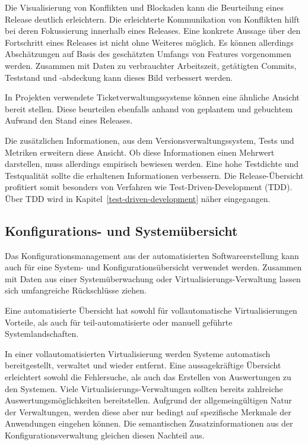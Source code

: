 Die Visualisierung von Konflikten und Blockaden kann die Beurteilung eines Release deutlich erleichtern. Die erleichterte Kommunikation von Konflikten hilft bei deren Fokussierung innerhalb eines Releases. Eine konkrete Aussage über den Fortschritt eines Releases ist nicht ohne Weiteres möglich. Es können allerdings Abschätzungen auf Basis des geschätzten Umfangs von Features vorgenommen werden. Zusammen mit Daten zu verbrauchter Arbeitszeit, getätigten Commits, Teststand und -abdeckung kann dieses Bild verbessert werden.

In Projekten verwendete Ticketverwaltungssysteme können eine ähnliche Ansicht bereit stellen. Diese beurteilen ebenfalls anhand von geplantem und gebuchtem Aufwand den Stand eines Releases.

Die zusätzlichen Informationen, aus dem Versionsverwaltungssystem, Tests und Metriken erweitern diese Ansicht. Ob diese Informationen einen Mehrwert darstellen, muss allerdings empirisch bewiesen werden.
Eine hohe Testdichte und Testqualität sollte die erhaltenen Informationen verbessern. Die Release-Übersicht profitiert somit besonders von Verfahren wie Test-Driven-Development (TDD). Über TDD wird in Kapitel~\ref{test-driven-development} näher eingegangen.

\subsection{Konfigurations- und Systemübersicht}
\label{subsubsec:configuration-system-overview}

Das Konfigurationsmanagement aus der automatisierten Softwareerstellung kann auch für eine System- und Konfigurationsübersicht verwendet werden. Zusammen mit Daten aus einer Systemüberwachung oder Virtualisierungs-Verwaltung lassen sich umfangreiche Rückschlüsse ziehen. 

Eine automatisierte Übersicht hat sowohl für vollautomatische Virtualisierungen Vorteile, als auch für teil-automatisierte oder manuell geführte Systemlandschaften.

In einer vollautomatisierten Virtualisierung werden Systeme automatisch bereitgestellt, verwaltet und wieder entfernt. Eine aussagekräftige Übersicht erleichtert sowohl die Fehlersuche, als auch das Erstellen von Auswertungen zu den Systemen. Viele Virtualisierungs-Verwaltungen sollten bereits zahlreiche Auswertungsmöglichkeiten bereitstellen. Aufgrund der allgemeingültigen Natur der Verwaltungen, werden diese aber nur bedingt auf spezifische Merkmale der Anwendungen eingehen können. Die semantischen Zusatzinformationen aus der Konfigurationsverwaltung gleichen diesen Nachteil aus.

